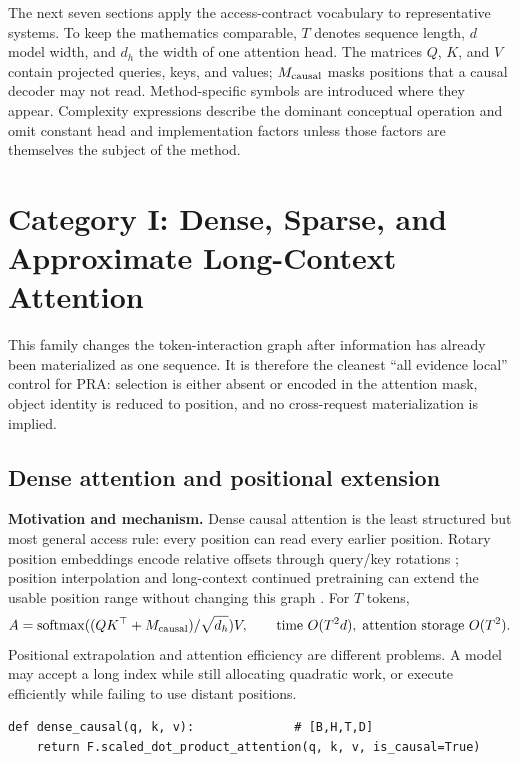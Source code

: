 The next seven sections apply the access-contract vocabulary to representative systems.
To keep the mathematics comparable, $T$ denotes sequence length, $d$ model width, and
$d_h$ the width of one attention head. The matrices $Q$, $K$, and $V$ contain projected
queries, keys, and values; $M_{\rm causal}$ masks positions that a causal decoder may not
read. Method-specific symbols are introduced where they appear. Complexity expressions
describe the dominant conceptual operation and omit constant head and implementation
factors unless those factors are themselves the subject of the method.

\section{Category I: Dense, Sparse, and Approximate Long-Context Attention}

This family changes the token-interaction graph after information has already been
materialized as one sequence.  It is therefore the cleanest ``all evidence local'' control
for PRA: selection is either absent or encoded in the attention mask, object identity is
reduced to position, and no cross-request materialization is implied.

\subsection{Dense attention and positional extension}

\textbf{Motivation and mechanism.} Dense causal attention is the least structured but
most general access rule: every position can read every earlier position. Rotary position
embeddings encode relative offsets through query/key rotations \citep{su2021roformer};
position interpolation and long-context continued pretraining can extend the usable position
range without changing this graph \citep{chen2023position}. For $T$ tokens,
\begin{equation}
A=\operatorname{softmax}((QK^\top+M_{\rm causal})/\sqrt{d_h})V,
\qquad \text{time }O(T^2d),\;\text{attention storage }O(T^2).
\end{equation}
Positional extrapolation and attention efficiency are different problems. A model may
accept a long index while still allocating quadratic
work, or execute efficiently while failing to use distant positions.

\begin{lstlisting}[caption={Dense causal attention; PyTorch uses optimized kernels when possible}]
def dense_causal(q, k, v):              # [B,H,T,D]
    return F.scaled_dot_product_attention(q, k, v, is_causal=True)
\end{lstlisting}

